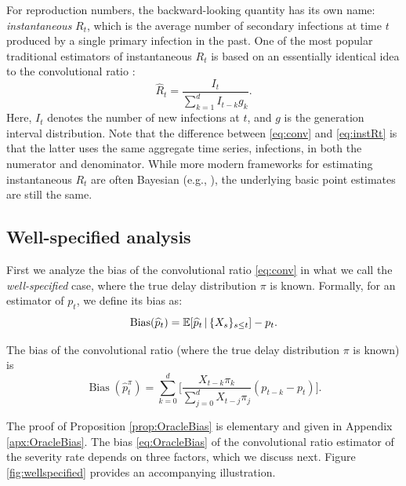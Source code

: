 \documentclass{article}
\renewcommand{\hat}{\widehat} %
\newcommand{\given}{\, \vert \,}
\DeclareMathOperator{\bias}{Bias}
\begin{document}
For reproduction numbers, the backward-looking quantity has its own name:
\emph{instantaneous} $R_t$, which is the average number of secondary infections
at time $t$ produced by a single primary infection in the past. One of the most
popular traditional estimators of instantaneous $R_t$ is based on an essentially 
identical idea to the convolutional ratio \citep{fraser2007, wallinga2007how}: 
\begin{equation}
\label{eq:instRt}
\hat{R}_t = \frac{I_t}{\sum_{k=1}^d I_{t-k} g_k}.
\end{equation}
Here, $I_t$ denotes the number of new infections at $t$, and $g$ is the
generation interval distribution. Note that the difference between
\eqref{eq:conv} and \eqref{eq:instRt} is that the latter uses the same aggregate 
time series, infections, in both the numerator and denominator. While more
modern frameworks for estimating instantaneous $R_t$ are often Bayesian (e.g.,
\citealp{cori2013new}), the underlying basic point estimates are still the same.

\subsection{Well-specified analysis}
\label{sec:wellspecified}

First we analyze the bias of the convolutional ratio \eqref{eq:conv} in what we  
call the \emph{well-specified} case, where the true delay distribution $\pi$ is 
known. Formally, for an estimator \smash{$\hat{p}_t$} of $p_t$, we define its
bias as:     
\[
\bias(\hat{p}_t) = \E[\hat{p}_t \given \{X_s\}_{s\leq t}] - p_t. 
\]

\begin{proposition}
\label{prop:OracleBias}
The bias of the convolutional ratio \smash{$\hat{p}_t^\pi$} (where the true
delay distribution $\pi$ is known) is 
\begin{equation}
\label{eq:OracleBias}
\bias(\hat{p}_t^\pi)  = \sum_{k=0}^d \Bigg[ \frac{X_{t-k}\pi_k}{\sum_{j=0}^d
  X_{t-j}\pi_j} (p_{t-k}-p_t) \Bigg]. 
\end{equation}
\end{proposition}
The proof of Proposition \ref{prop:OracleBias} is elementary and given in
Appendix \ref{apx:OracleBias}. The bias \eqref{eq:OracleBias} of the
convolutional ratio estimator of the severity rate depends on three factors,
which we discuss next. Figure \ref{fig:wellspecified} provides an accompanying
illustration.     
\end{document}
